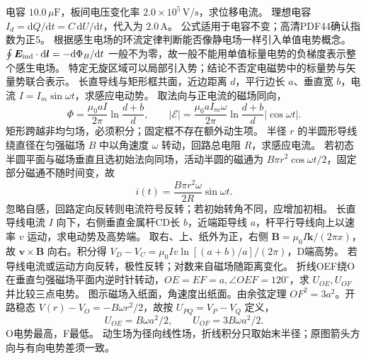 \problemtext 电容 $10.0\,\mu\mathrm F$，板间电压变化率 $2.0\times10^5\,\mathrm{V/s}$，求位移电流。
\workings 理想电容 $I_d=\mathrm dQ/\mathrm dt=C\,\mathrm dU/\mathrm dt$，代入为 $2.0\,\mathrm A$。
\crosscheck 公式适用于电容不变；高清PDF44确认指数为正5。
\problemtext 根据感生电场的环流定律判断能否像静电场一样引入单值电势概念。
\workings $\oint\bm E_{\rm ind}\cdot\mathrm d\bm l=-\mathrm d\Phi_B/\mathrm dt$ 一般不为零，故一般不能用单值标量电势的负梯度表示整个感生电场。
\crosscheck 特定无旋区域可以局部引入势；结论不否定电磁势中的标量势与矢量势联合表示。
\problemtext 长直导线与矩形框共面，近边距离 $d$，平行边长 $a$、垂直宽 $b$，电流 $I=I_m\sin\omega t$，求感应电动势。
\workings 取法向与正电流的磁场同向，
\[
\Phi=\frac{\mu_0aI}{2\pi}\ln\frac{d+b}{d},\qquad
|\mathcal E|=\frac{\mu_0a I_m\omega}{2\pi}\ln\frac{d+b}{d}|\cos\omega t|.
\]
\crosscheck 矩形跨越非均匀场，必须积分；固定框不存在额外动生项。
\problemtext 半径 $r$ 的半圆形导线绕直径在匀强磁场 $B$ 中以角速度 $\omega$ 转动，回路总电阻 $R$，求感应电流。
\workings 若初态半圆平面与磁场垂直且选初始法向同场，活动半圆的磁通为 $B\pi r^2\cos\omega t/2$，固定部分磁通不随时间变，故
\[
i(t)=\frac{B\pi r^2\omega}{2R}\sin\omega t .
\]
\crosscheck 忽略自感，回路定向反转则电流符号反转；若初始转角不同，应增加初相。
\problemtext 长直导线电流 $I$ 向下，右侧垂直金属杆CD长 $b$，近端距导线 $a$，杆平行导线向上以速率 $v$ 运动，求电动势及高势端。
\workings 取右、上、纸外为正，右侧 $\bm B=\mu_0 I\bm k/(2\pi x)$，故 $\bm v\times\bm B$ 向右。积分得 $V_D-V_C=\mu_0 Iv\ln[(a+b)/a]/(2\pi)$，D端高势。
\crosscheck 若导线电流或运动方向反转，极性反转；对数来自磁场随距离变化。
\problemtext 折线OEF绕O在垂直匀强磁场平面内逆时针转动，$OE=EF=a,\angle OEF=120^\circ$，求 $U_{OE},U_{OF}$ 并比较三点电势。
\workings 图示磁场入纸面，角速度出纸面。由余弦定理 $OF^2=3a^2$。开路稳态 $V(r)-V_O=-B\omega r^2/2$，故按 $U_{PQ}=V_P-V_Q$ 定义，
\[
U_{OE}=B\omega a^2/2,\qquad U_{OF}=3B\omega a^2/2.
\]
O电势最高，F最低。
\crosscheck 动生场为径向线性场，折线积分只取始末半径；原图箭头方向与有向电势差须一致。
